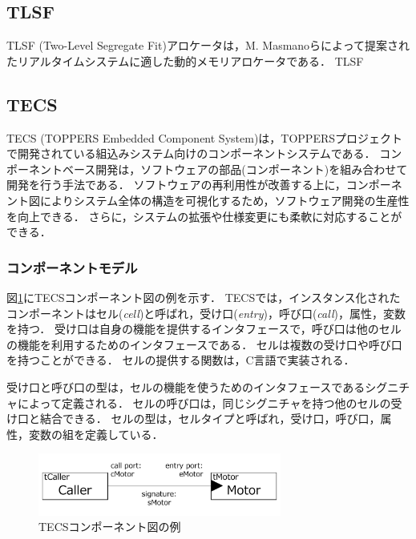 \documentclass[submit]{ipsj_v2/UTF8/ipsj}
\begin{document}
\subsection{TLSF}
\label{sec:TLSF}
TLSF (Two-Level Segregate Fit)アロケータは，M. Masmanoらによって提案されたリアルタイムシステムに適した動的メモリアロケータである．
TLSF

\subsection{TECS}
TECS (TOPPERS Embedded Component System)は，TOPPERSプロジェクトで開発されている組込みシステム向けのコンポーネントシステムである．
コンポーネントベース開発は，ソフトウェアの部品(コンポーネント)を組み合わせて開発を行う手法である．
ソフトウェアの再利用性が改善する上に，コンポーネント図によりシステム全体の構造を可視化するため，ソフトウェア開発の生産性を向上できる．
さらに，システムの拡張や仕様変更にも柔軟に対応することができる．


\subsubsection{コンポーネントモデル}
図\ref{fig:component}にTECSコンポーネント図の例を示す．
TECSでは，インスタンス化されたコンポーネントはセル({\it cell})と呼ばれ，受け口({\it entry})，呼び口({\it call})，属性，変数を持つ．
受け口は自身の機能を提供するインタフェースで，呼び口は他のセルの機能を利用するためのインタフェースである．
セルは複数の受け口や呼び口を持つことができる．
セルの提供する関数は，C言語で実装される．

受け口と呼び口の型は，セルの機能を使うためのインタフェースであるシグニチャによって定義される．
セルの呼び口は，同じシグニチャを持つ他のセルの受け口と結合できる．
セルの型は，セルタイプと呼ばれ，受け口，呼び口，属性，変数の組を定義している．

\begin{figure}[t]
    \centering
    \includegraphics[width=8cm,clip]{../EMSOFT2016/figure/component_diagram.pdf}
    \caption{TECSコンポーネント図の例}
    \label{fig:component}
\end{figure}
\end{document}
